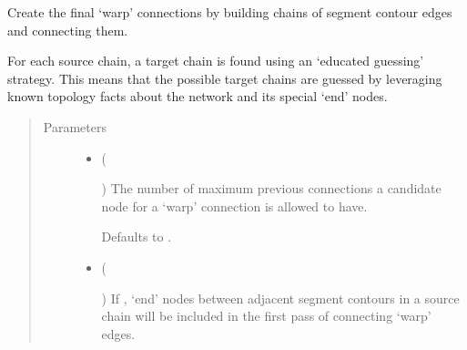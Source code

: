 \documentclass[letterpaper,10pt,english]{sphinxmanual}
\begin{document}
\begin{fulllineitems}

\begin{fulllineitems}
\label{\detokenize{cockatoo:cockatoo.KnitNetwork.create_final_warp_connections}}
Create the final ‘warp’ connections by building chains of segment
contour edges and connecting them.

For each source chain, a target chain is found using an
‘educated guessing’ strategy. This means that the possible target
chains are guessed by leveraging known topology facts about the network
and its special ‘end’ nodes.
\begin{quote}\begin{description}
\item[{Parameters}] \leavevmode\begin{itemize}
\item {} 
 (%
\begin{footnote}[122]\sphinxAtStartFootnote
{}
%
\end{footnote}\sphinxstyleliteralemphasis{\sphinxupquote{, }}) \textendash{} 
The number of maximum previous connections a candidate node for a
‘warp’ connection is allowed to have.

Defaults to .


\item {} 
 (%
\begin{footnote}[123]\sphinxAtStartFootnote
{}
%
\end{footnote}\sphinxstyleliteralemphasis{\sphinxupquote{, }}) \textendash{} 
If , ‘end’ nodes between adjacent segment contours in a
source chain will be included in the first pass of connecting
‘warp’ edges.


\end{itemize}
\end{description}
\end{quote}
\end{fulllineitems}
\end{fulllineitems}
\end{document}
